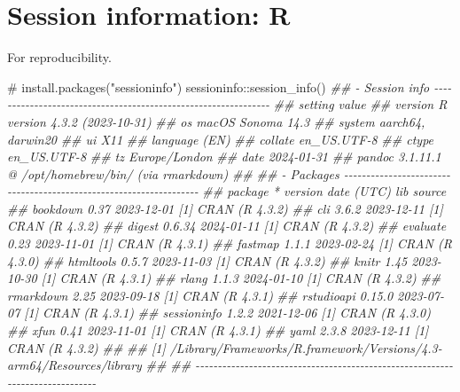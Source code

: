 \documentclass[
  10pt,
  a4paper,
]{book}
\newenvironment{Shaded}{\begin{snugshade}}{\end{snugshade}}
\newcommand{\CommentTok}[1]{\textcolor[rgb]{0.37,0.37,0.37}{#1}}
\newcommand{\DocumentationTok}[1]{\textcolor[rgb]{0.37,0.37,0.37}{\textit{#1}}}
\newcommand{\FunctionTok}[1]{\textcolor[rgb]{0.28,0.35,0.67}{#1}}
\newcommand{\NormalTok}[1]{\textcolor[rgb]{0.00,0.46,0.62}{#1}}
\newcommand{\SpecialCharTok}[1]{\textcolor[rgb]{0.37,0.37,0.37}{#1}}
\begin{document}
\chapter*{Session information: R}\label{session-information-r}

For reproducibility.

\begin{Shaded}
\begin{Highlighting}[]
\CommentTok{\# install.packages("sessioninfo")}
\NormalTok{sessioninfo}\SpecialCharTok{::}\FunctionTok{session\_info}\NormalTok{()}
\DocumentationTok{\#\# {-} Session info {-}{-}{-}{-}{-}{-}{-}{-}{-}{-}{-}{-}{-}{-}{-}{-}{-}{-}{-}{-}{-}{-}{-}{-}{-}{-}{-}{-}{-}{-}{-}{-}{-}{-}{-}{-}{-}{-}{-}{-}{-}{-}{-}{-}{-}{-}{-}{-}{-}{-}{-}{-}{-}{-}{-}{-}{-}{-}{-}{-}{-}{-}{-}}
\DocumentationTok{\#\#  setting  value}
\DocumentationTok{\#\#  version  R version 4.3.2 (2023{-}10{-}31)}
\DocumentationTok{\#\#  os       macOS Sonoma 14.3}
\DocumentationTok{\#\#  system   aarch64, darwin20}
\DocumentationTok{\#\#  ui       X11}
\DocumentationTok{\#\#  language (EN)}
\DocumentationTok{\#\#  collate  en\_US.UTF{-}8}
\DocumentationTok{\#\#  ctype    en\_US.UTF{-}8}
\DocumentationTok{\#\#  tz       Europe/London}
\DocumentationTok{\#\#  date     2024{-}01{-}31}
\DocumentationTok{\#\#  pandoc   3.1.11.1 @ /opt/homebrew/bin/ (via rmarkdown)}
\DocumentationTok{\#\# }
\DocumentationTok{\#\# {-} Packages {-}{-}{-}{-}{-}{-}{-}{-}{-}{-}{-}{-}{-}{-}{-}{-}{-}{-}{-}{-}{-}{-}{-}{-}{-}{-}{-}{-}{-}{-}{-}{-}{-}{-}{-}{-}{-}{-}{-}{-}{-}{-}{-}{-}{-}{-}{-}{-}{-}{-}{-}{-}{-}{-}{-}{-}{-}{-}{-}{-}{-}{-}{-}{-}{-}{-}{-}}
\DocumentationTok{\#\#  package     * version date (UTC) lib source}
\DocumentationTok{\#\#  bookdown      0.37    2023{-}12{-}01 [1] CRAN (R 4.3.2)}
\DocumentationTok{\#\#  cli           3.6.2   2023{-}12{-}11 [1] CRAN (R 4.3.2)}
\DocumentationTok{\#\#  digest        0.6.34  2024{-}01{-}11 [1] CRAN (R 4.3.2)}
\DocumentationTok{\#\#  evaluate      0.23    2023{-}11{-}01 [1] CRAN (R 4.3.1)}
\DocumentationTok{\#\#  fastmap       1.1.1   2023{-}02{-}24 [1] CRAN (R 4.3.0)}
\DocumentationTok{\#\#  htmltools     0.5.7   2023{-}11{-}03 [1] CRAN (R 4.3.2)}
\DocumentationTok{\#\#  knitr         1.45    2023{-}10{-}30 [1] CRAN (R 4.3.1)}
\DocumentationTok{\#\#  rlang         1.1.3   2024{-}01{-}10 [1] CRAN (R 4.3.2)}
\DocumentationTok{\#\#  rmarkdown     2.25    2023{-}09{-}18 [1] CRAN (R 4.3.1)}
\DocumentationTok{\#\#  rstudioapi    0.15.0  2023{-}07{-}07 [1] CRAN (R 4.3.1)}
\DocumentationTok{\#\#  sessioninfo   1.2.2   2021{-}12{-}06 [1] CRAN (R 4.3.0)}
\DocumentationTok{\#\#  xfun          0.41    2023{-}11{-}01 [1] CRAN (R 4.3.1)}
\DocumentationTok{\#\#  yaml          2.3.8   2023{-}12{-}11 [1] CRAN (R 4.3.2)}
\DocumentationTok{\#\# }
\DocumentationTok{\#\#  [1] /Library/Frameworks/R.framework/Versions/4.3{-}arm64/Resources/library}
\DocumentationTok{\#\# }
\DocumentationTok{\#\# {-}{-}{-}{-}{-}{-}{-}{-}{-}{-}{-}{-}{-}{-}{-}{-}{-}{-}{-}{-}{-}{-}{-}{-}{-}{-}{-}{-}{-}{-}{-}{-}{-}{-}{-}{-}{-}{-}{-}{-}{-}{-}{-}{-}{-}{-}{-}{-}{-}{-}{-}{-}{-}{-}{-}{-}{-}{-}{-}{-}{-}{-}{-}{-}{-}{-}{-}{-}{-}{-}{-}{-}{-}{-}{-}{-}{-}{-}}
\end{Highlighting}
\end{Shaded}
\end{document}
